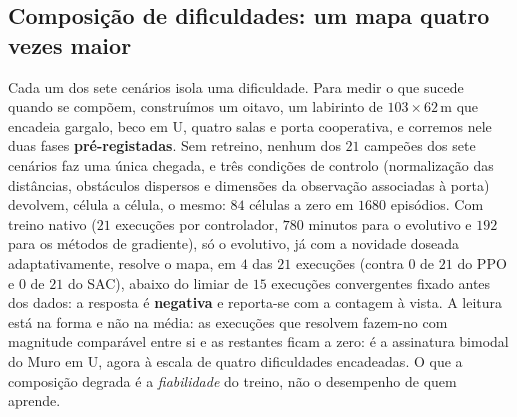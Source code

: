 \documentclass[final,5p,times,twocolumn,authoryear]{elsarticle}
\begin{document}
\subsection{Composição de dificuldades: um mapa quatro vezes maior}
\label{sec:mapa_composto}
 Cada um dos sete cenários isola uma dificuldade. Para medir o que sucede quando
se compõem, construímos um oitavo, um labirinto de $103\times62$\,m que
encadeia gargalo, beco em U, quatro salas e porta cooperativa, e corremos nele
duas fases \textbf{pré-registadas}. Sem retreino, nenhum dos $21$ campeões dos
sete cenários faz uma única chegada, e três condições de controlo (normalização
das distâncias, obstáculos dispersos e dimensões da observação associadas à
porta) devolvem, célula a célula, o mesmo: $84$ células a zero em $1680$
episódios. Com treino nativo ($21$ execuções por controlador, $780$ minutos para
o evolutivo e $192$ para os métodos de gradiente), só o evolutivo, já com a
novidade doseada adaptativamente, resolve o mapa,
em $4$ das $21$ execuções (contra $0$ de $21$ do PPO e $0$ de $21$ do SAC),
abaixo do limiar de $15$ execuções convergentes fixado antes dos dados: a
resposta é \textbf{negativa} e reporta-se com a contagem à vista. A leitura está
na forma e não na média: as execuções que resolvem fazem-no com magnitude
comparável entre si e as restantes ficam a zero: é a assinatura bimodal do Muro
em U, agora à escala de quatro dificuldades encadeadas. O que a composição
degrada é a \emph{fiabilidade} do treino, não o desempenho de quem aprende.
\end{document}
